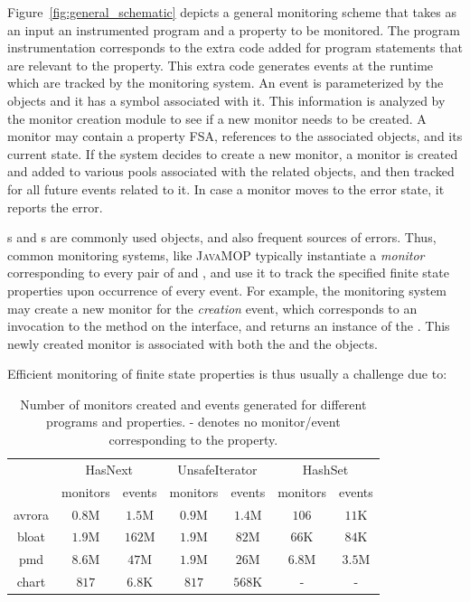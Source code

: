 Figure~\ref{fig:general_schematic} depicts a general monitoring scheme that takes as 
an input an instrumented program and a property to be monitored. The program
instrumentation corresponds to the extra code added for program statements 
that are relevant to the property. This extra code generates events at the runtime
which are tracked by the monitoring system. An event is parameterized by
the objects and it has a symbol associated with it. This information is analyzed
by the monitor creation module to see if a new monitor needs to be created. A
monitor may contain a property FSA, references to the associated objects, and its
current state. If the system decides to create a new monitor, a monitor is created
and added to various pools
associated with the related objects, and then tracked for all future events
related to it. In case a monitor moves to the error state, it reports the error.

s and s are commonly used objects, and also 
frequent sources of errors. Thus, common monitoring systems, like 
\textsc{JavaMOP} typically instantiate a \textit{monitor} corresponding to every 
pair of  and , and use it to track the 
specified finite state properties upon occurrence of every event. For example, 
the monitoring system may create a new monitor for the \textit{creation} event, 
which corresponds to an invocation to the  method on the 
 interface, and returns an instance of the .
This newly created monitor is associated with both the  and 
the  objects.

 Efficient monitoring of finite state properties is 
thus usually a challenge due to:

\begin{table}[t]
\centering
\small
\begin{tabular}{|c|c|c|c|c|c|c|}
\hline
\multirow{2}{*}{} & \multicolumn{2}{c|}{HasNext} & 
\multicolumn{2}{c|}{UnsafeIterator} & \multicolumn{2}{c|}{HashSet}\\
\cline{2-7} 
                  & monitors     & events        & monitors         & events   
                  & monitors         & events \\ \hline
avrora      & $0.8$M & $1.5$M  & $0.9$M  & $1.4$M  & $106$ & $11$K \\\hline 
bloat   & $1.9$M  & $162$M & $1.9$M  & $82$M   &$66$K& $84$K  \\\hline 
pmd  & $8.6$M      & $47$M      & $1.9$M    & $26$M & $6.8$M & $3.5$M\\ \hline
chart  & $817$ & $6.8$K    &  $817$  & $568$K & - & -\\ \hline
\end{tabular}
\caption{Number of monitors created and events generated for different programs 
and properties. - denotes no monitor/event corresponding to the property.
}
\end{table}
\label{table:numofmonitors}

